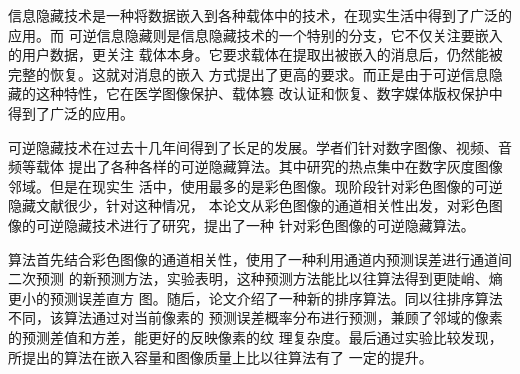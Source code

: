 ﻿
\begin{cnabstract}
信息隐藏技术是一种将数据嵌入到各种载体中的技术，在现实生活中得到了广泛的应用。而
可逆信息隐藏则是信息隐藏技术的一个特别的分支，它不仅关注要嵌入的用户数据，更关注
载体本身。它要求载体在提取出被嵌入的消息后，仍然能被完整的恢复。这就对消息的嵌入
方式提出了更高的要求。而正是由于可逆信息隐藏的这种特性，它在医学图像保护、载体篡
改认证和恢复、数字媒体版权保护中得到了广泛的应用。
\par
可逆隐藏技术在过去十几年间得到了长足的发展。学者们针对数字图像、视频、音频等载体
提出了各种各样的可逆隐藏算法。其中研究的热点集中在数字灰度图像邻域。但是在现实生
活中，使用最多的是彩色图像。现阶段针对彩色图像的可逆隐藏文献很少，针对这种情况，
本论文从彩色图像的通道相关性出发，对彩色图像的可逆隐藏技术进行了研究，提出了一种
针对彩色图像的可逆隐藏算法。
\par
算法首先结合彩色图像的通道相关性，使用了一种利用通道内预测误差进行通道间二次预测
的新预测方法，实验表明，这种预测方法能比以往算法得到更陡峭、熵更小的预测误差直方
图。随后，论文介绍了一种新的排序算法。同以往排序算法不同，该算法通过对当前像素的
预测误差概率分布进行预测，兼顾了邻域的像素的预测差值和方差，能更好的反映像素的纹
理复杂度。最后通过实验比较发现，所提出的算法在嵌入容量和图像质量上比以往算法有了
一定的提升。

\end{cnabstract}


